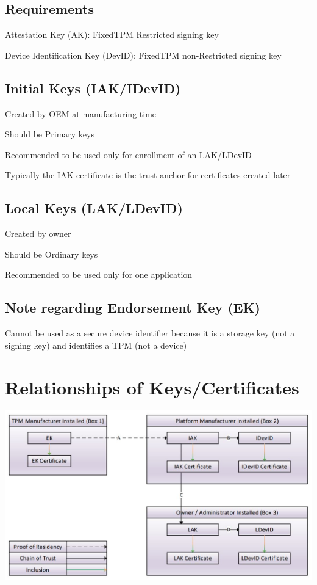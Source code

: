 \documentclass{article}
\begin{document}
\subsection*{Requirements}
Attestation Key (AK): FixedTPM Restricted signing key

Device Identification Key (DevID): FixedTPM non-Restricted signing key

\subsection*{Initial Keys (IAK/IDevID)}
Created by OEM at manufacturing time

Should be Primary keys

Recommended to be used only for enrollment of an LAK/LDevID

Typically the IAK certificate is the trust anchor for certificates created later

\subsection*{Local Keys (LAK/LDevID)}
Created by owner

Should be Ordinary keys

Recommended to be used only for one application

\subsection*{Note regarding Endorsement Key (EK)}
Cannot be used as a secure device identifier because it is a storage key (not a signing key) and identifies a TPM (not a device)

\section*{Relationships of Keys/Certificates}
\includegraphics[scale=0.6]{certificateRelationships.jpg}
\end{document}
